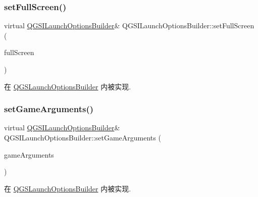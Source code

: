 \subsubsection{\texorpdfstring{set\+Full\+Screen()}{setFullScreen()}}
{\footnotesize\ttfamily virtual \mbox{\hyperlink{class_q_g_s_i_launch_options_builder}{Q\+G\+S\+I\+Launch\+Options\+Builder}}\& Q\+G\+S\+I\+Launch\+Options\+Builder\+::set\+Full\+Screen (\begin{DoxyParamCaption}\item[{const bool}]{full\+Screen }\end{DoxyParamCaption})\hspace{0.3cm}{\ttfamily [pure virtual]}}



在 \mbox{\hyperlink{class_q_g_s_launch_options_builder_a8d77cb303f2d490ef5eea478518c7d8d}{Q\+G\+S\+Launch\+Options\+Builder}} 内被实现.

\mbox{\label{class_q_g_s_i_launch_options_builder_a6f428d4accdd640f6a3e58a3d69d2e6c}} 
\subsubsection{\texorpdfstring{set\+Game\+Arguments()}{setGameArguments()}}
{\footnotesize\ttfamily virtual \mbox{\hyperlink{class_q_g_s_i_launch_options_builder}{Q\+G\+S\+I\+Launch\+Options\+Builder}}\& Q\+G\+S\+I\+Launch\+Options\+Builder\+::set\+Game\+Arguments (\begin{DoxyParamCaption}\item[{const Q\+String \&}]{game\+Arguments }\end{DoxyParamCaption})\hspace{0.3cm}{\ttfamily [pure virtual]}}



在 \mbox{\hyperlink{class_q_g_s_launch_options_builder_a6e6403b36902ac004af9ed2e9a9726c6}{Q\+G\+S\+Launch\+Options\+Builder}} 内被实现.

\mbox{\label{class_q_g_s_i_launch_options_builder_a4c29f3bf074aec2d11c5b661b9b95271}} 
